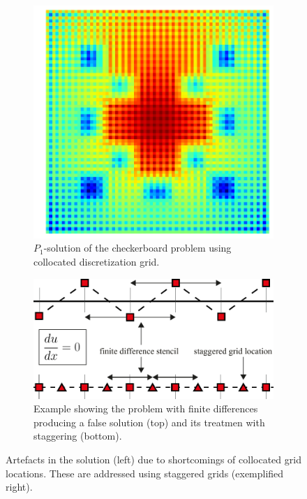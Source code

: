 \begin{figure}[h]
\centering
\begin{subfigure}[t]{0.49\columnwidth}
\centering
\includegraphics[width=\columnwidth]{04_pn_method/results/checkerboard2d_p1_collocated.png}
\caption{$P_1$-solution of the checkerboard problem using collocated discretization grid.}
\label{fig:pn_collocated_grid_artefacts}
\end{subfigure}%
\hspace{0.01\columnwidth}
\begin{subfigure}[t]{0.49\columnwidth}
\centering
\includegraphics[width=\columnwidth]{04_pn_method/figures/fig_staggered_grid_1d_example.pdf}
\caption{Example showing the problem with finite differences producing a false solution (top) and its treatmen with staggering (bottom).}
\label{fig:pn_staggered_grid_idea}
\end{subfigure}%
\caption{Artefacts in the solution (left) due to shortcomings of collocated grid locations. These are addressed using staggered grids (exemplified right).}
\label{fig:pn_staggered_grid_problems}
\end{figure}

